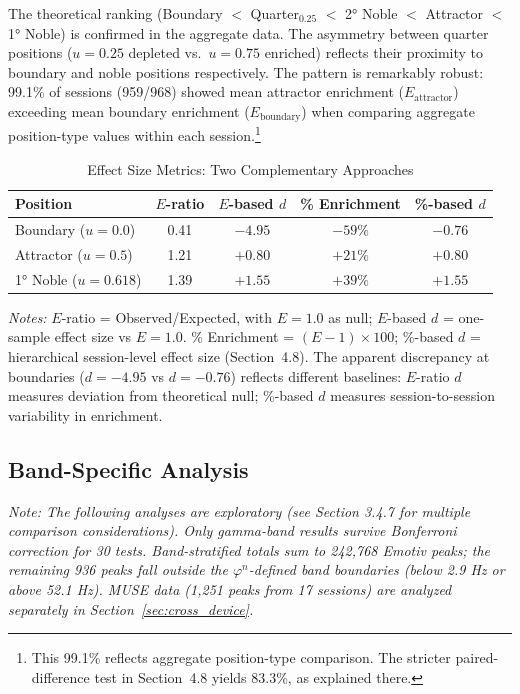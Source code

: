 \documentclass[11pt,a4paper]{article}
\newcommand{\phisym}{\varphi}
\begin{document}
The theoretical ranking (Boundary $<$ Quarter$_{0.25}$ $<$ 2° Noble $<$ Attractor $<$ 1° Noble) is confirmed in the aggregate data. The asymmetry between quarter positions ($u = 0.25$ depleted vs.\ $u = 0.75$ enriched) reflects their proximity to boundary and noble positions respectively. The pattern is remarkably robust: 99.1\% of sessions (959/968) showed mean attractor enrichment ($E_{\text{attractor}}$) exceeding mean boundary enrichment ($E_{\text{boundary}}$) when comparing aggregate position-type values within each session.\footnote{This 99.1\% reflects aggregate position-type comparison. The stricter paired-difference test in Section~4.8 yields 83.3\%, as explained there.}

\begin{table}[H]
\centering
\caption{Effect Size Metrics: Two Complementary Approaches}
\label{tab:effect_reconciliation}
\begin{tabular}{@{}lcccc@{}}
\toprule
Position & $E$-ratio & $E$-based $d$ & \% Enrichment & \%-based $d$ \\
\midrule
Boundary ($u = 0.0$) & 0.41 & $-4.95$ & $-59\%$ & $-0.76$ \\
Attractor ($u = 0.5$) & 1.21 & $+0.80$ & $+21\%$ & $+0.80$ \\
1° Noble ($u = 0.618$) & 1.39 & $+1.55$ & $+39\%$ & $+1.55$ \\
\bottomrule
\end{tabular}
\begin{flushleft}
\small
\textit{Notes:} $E$-ratio = Observed/Expected, with $E = 1.0$ as null; $E$-based $d$ = one-sample effect size vs $E = 1.0$. \% Enrichment = $(E - 1) \times 100$; \%-based $d$ = hierarchical session-level effect size (Section~4.8). The apparent discrepancy at boundaries ($d = -4.95$ vs $d = -0.76$) reflects different baselines: $E$-ratio $d$ measures deviation from theoretical null; \%-based $d$ measures session-to-session variability in enrichment.
\end{flushleft}
\end{table}

\subsection{Band-Specific Analysis}

\noindent\textit{Note: The following analyses are exploratory (see Section 3.4.7 for multiple comparison considerations). Only gamma-band results survive Bonferroni correction for 30 tests. Band-stratified totals sum to 242,768 Emotiv peaks; the remaining 936 peaks fall outside the $\phisym^n$-defined band boundaries (below 2.9 Hz or above 52.1 Hz). MUSE data (1,251 peaks from 17 sessions) are analyzed separately in Section~\ref{sec:cross_device}.}
\end{document}
